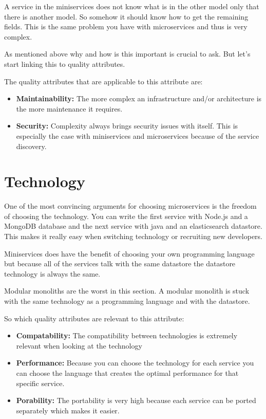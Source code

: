 A service in the miniservices does not know what is in the other model only that there is another model. So somehow it should know how to get the remaining fields. This is the same problem you have with microservices and thus is very complex.

As mentioned above why and how is this important is crucial to ask. But let’s start linking this to quality attributes.

The quality attributes that are applicable to this attribute are:
\begin{itemize}
        \item \textbf{Maintainability:} The more complex an infrastructure and/or architecture is the more maintenance it requires.
        \item \textbf{Security:} Complexity always brings security issues with itself. This is especially the case with miniservices and microservices because of the service discovery.
\end{itemize}

\section{Technology}
\label{sec:Technology}

One of the most convincing arguments for choosing microservices is the freedom of choosing the technology. You can write the first service with Node.js and a MongoDB database and the next service with java and an elasticsearch datastore. This makes it really easy when switching technology or recruiting new developers.

Miniservices does have the benefit of choosing your own programming language but because all of the services talk with the same datastore the datastore technology is always the same.

Modular monoliths are the worst in this section. A modular monolith is stuck with the same technology as a programming language and with the datastore.

So which quality attributes are relevant to this attribute:
\begin{itemize}
        \item \textbf{Compatability:} The compatibility between technologies is extremely relevant when looking at the technology
        \item \textbf{Performance:} Because you can choose the technology for each service you can choose the language that creates the optimal performance for that specific service.
        \item \textbf{Porability:} The portability is very high because each service can be ported separately which makes it easier.
\end{itemize}

